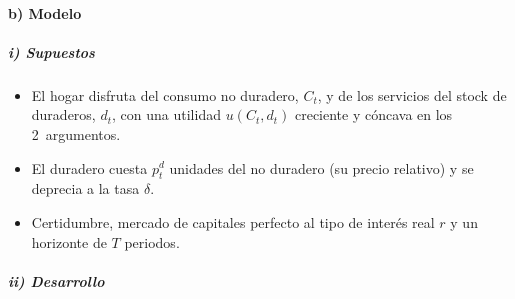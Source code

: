 \documentclass[11pt]{article}
\begin{document}
\paragraph{b) Modelo}

\subparagraph{i) Supuestos}

\begin{itemize}
\item El hogar disfruta del consumo no duradero, $C_t$, y de los servicios del stock de duraderos, $d_t$, con una utilidad $u(C_t,d_t)$ creciente y cóncava en los 2~argumentos.
\item El duradero cuesta $p^d_t$ unidades del no duradero (su precio relativo) y se deprecia a la tasa $\delta$.
\item Certidumbre, mercado de capitales perfecto al tipo de interés real $r$ y un horizonte de $T$ periodos.
\end{itemize}

\subparagraph{ii) Desarrollo}
\end{document}
